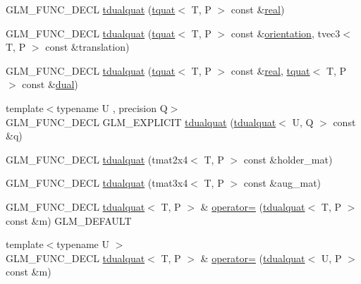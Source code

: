 \begin{DoxyCompactItemize}
G\+L\+M\+\_\+\+F\+U\+N\+C\+\_\+\+D\+E\+C\+L \hyperlink{structglm_1_1tdualquat_abdd66f88fc81bfe1414a790b79fc7ef2}{tdualquat} (\hyperlink{structglm_1_1tquat}{tquat}$<$ T, P $>$ const \&\hyperlink{structglm_1_1tdualquat_a402b3ac8410bd71a27f811dced8db14e}{real})
\item 
G\+L\+M\+\_\+\+F\+U\+N\+C\+\_\+\+D\+E\+C\+L \hyperlink{structglm_1_1tdualquat_a7b101938df36b852ec5fb65e0a94fd3c}{tdualquat} (\hyperlink{structglm_1_1tquat}{tquat}$<$ T, P $>$ const \&\hyperlink{group__gtx__rotate__vector_ga49b4d082305cdfcfe0a5c184f684a902}{orientation}, tvec3$<$ T, P $>$ const \&translation)
\item 
G\+L\+M\+\_\+\+F\+U\+N\+C\+\_\+\+D\+E\+C\+L \hyperlink{structglm_1_1tdualquat_a4018079bddbe4539667db5b4e06f0f2c}{tdualquat} (\hyperlink{structglm_1_1tquat}{tquat}$<$ T, P $>$ const \&\hyperlink{structglm_1_1tdualquat_a402b3ac8410bd71a27f811dced8db14e}{real}, \hyperlink{structglm_1_1tquat}{tquat}$<$ T, P $>$ const \&\hyperlink{structglm_1_1tdualquat_abeea1eb15f230d3bc50740c3811e1fd3}{dual})
\item 
{\footnotesize template$<$typename U , precision Q$>$ }\\G\+L\+M\+\_\+\+F\+U\+N\+C\+\_\+\+D\+E\+C\+L G\+L\+M\+\_\+\+E\+X\+P\+L\+I\+C\+I\+T \hyperlink{structglm_1_1tdualquat_a0ddf32d81db25f4765955f04cf7afd86}{tdualquat} (\hyperlink{structglm_1_1tdualquat}{tdualquat}$<$ U, Q $>$ const \&q)
\item 
G\+L\+M\+\_\+\+F\+U\+N\+C\+\_\+\+D\+E\+C\+L \hyperlink{structglm_1_1tdualquat_a7b6503ed3770426be014ac5aa91d954f}{tdualquat} (tmat2x4$<$ T, P $>$ const \&holder\+\_\+mat)
\item 
G\+L\+M\+\_\+\+F\+U\+N\+C\+\_\+\+D\+E\+C\+L \hyperlink{structglm_1_1tdualquat_a826805f42bdbf606ce22f393bfd676f3}{tdualquat} (tmat3x4$<$ T, P $>$ const \&aug\+\_\+mat)
\item 
G\+L\+M\+\_\+\+F\+U\+N\+C\+\_\+\+D\+E\+C\+L \hyperlink{structglm_1_1tdualquat}{tdualquat}$<$ T, P $>$ \& \hyperlink{structglm_1_1tdualquat_a6481d3d33ee01fda77eb743680bfd8cd}{operator=} (\hyperlink{structglm_1_1tdualquat}{tdualquat}$<$ T, P $>$ const \&m) G\+L\+M\+\_\+\+D\+E\+F\+A\+U\+L\+T
\item 
{\footnotesize template$<$typename U $>$ }\\G\+L\+M\+\_\+\+F\+U\+N\+C\+\_\+\+D\+E\+C\+L \hyperlink{structglm_1_1tdualquat}{tdualquat}$<$ T, P $>$ \& \hyperlink{structglm_1_1tdualquat_a88370687edccdd5b6e62c9e314bc95c2}{operator=} (\hyperlink{structglm_1_1tdualquat}{tdualquat}$<$ U, P $>$ const \&m)
\item 

\end{DoxyCompactItemize}
